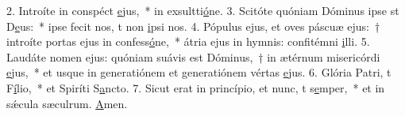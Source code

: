 2. Introíte in conspéct \uline{e}jus,~* in exsultti\uline{ó}ne.
3. Scitóte quóniam Dóminus ipse st D\uline{e}us:~* ipse fecit nos, t non \uline{i}psi nos.
4. Pópulus ejus, et oves páscuæ ejus:~† introíte portas ejus in confess\uline{ó}ne,~* átria ejus in hymnis: confitémni \uline{i}lli.
5. Laudáte nomen ejus: quóniam suávis est Dóminus,~† in ætérnum misericórdi \uline{e}jus,~* et usque in generatiónem et generatiónem vértas \uline{e}jus.
6. Glória Patri, t F\uline{í}lio,~* et Spiríti S\uline{a}ncto.
7. Sicut erat in princípio, et nunc, t s\uline{e}mper,~* et in sǽcula sæculrum. \uline{A}men.
